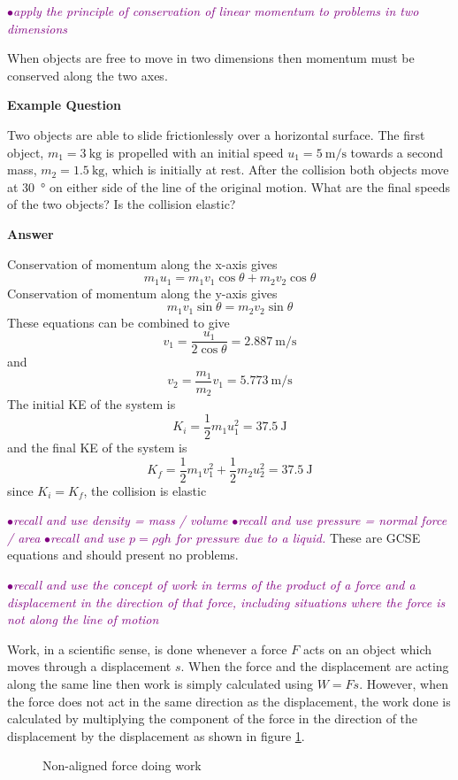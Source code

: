 \documentclass[a4paper,11pt,twoside]{memoir}
\newcounter{spec}[chapter]
\newcommand{\spec}[1]{\Needspace{5\baselineskip}\textcolor{purple}{$\bullet$\hspace{0.5cm}\textit{#1}}}
\newcommand{\answer}{\par \textbf{Answer} \par}
\newenvironment{example}
{\begin{lrbox}{\examplebox}\begin{minipage}{0.9\textwidth}\textbf{Example Question}\par}
{\end{minipage}\end{lrbox}\fbox{\usebox{\examplebox}}}
\begin{document}
\spec{apply the principle of conservation of linear momentum to problems in two dimensions}

When objects are free to move in two dimensions then momentum must be conserved along the two axes.

\begin{example}
	Two objects are able to slide frictionlessly over a horizontal surface. The first object, $m_1=\SI{3}{\kg}$ is propelled with an initial speed $u_1=\SI{5}{\m\per\s}$ towards a second mass, $m_2=\SI{1.5}{\kg}$, which is initially at rest. After the collision both objects move at \SI{30}{\degree} on either side of the line of the original motion. What are the final speeds of the two objects? Is the collision elastic?
	\answer
	Conservation of momentum along the x-axis gives
	$$ m_1u_1 = m_1v_1\cos{\theta} + m_2v_2\cos{\theta}$$
	Conservation of momentum along the y-axis gives
	$$ m_1v_1\sin{\theta} = m_2v_2\sin{\theta} $$
	These equations can be combined to give
	$$ v_1 = \frac{u_1}{2\cos{\theta}} = \SI{2.887}{\m\per\s}$$
	and
	$$ v_2 = \frac{m_1}{m_2}v_1= \SI{5.773}{\m\per\s}$$
	The initial KE of the system is
	$$ K_i = \frac{1}{2}m_1u_1^2 = \SI{37.5}{\joule} $$
	and the final KE of the system is
	$$ K_f = \frac{1}{2}m_1v_1^2 + \frac{1}{2}m_2u_2^2 = \SI{37.5}{\joule}$$
	since $K_i = K_f$, the collision is elastic
\end{example}

\spec{recall and use density = mass / volume}
\spec{recall and use pressure = normal force / area}
\spec{recall and use $ p = \rho gh $ for pressure due to a liquid.}
These are GCSE equations and should present no problems.

\spec{recall and use the concept of work in terms of the product of a force and a displacement in the direction of that force, including situations where the force is not along the line of motion}

Work, in a scientific sense, is done whenever a force $F$ acts on an object which moves through a displacement $s$. When the force and the displacement are acting along the same line then work is simply calculated using $W=Fs$. However, when the force does not act in the same direction as the displacement, the work done is calculated by multiplying the component of the force in the direction of the displacement by the displacement as shown in figure \ref{work}.

\begin{figure}[h]
  \begin{center}
  \end{center}
  \caption{Non-aligned force doing work}
  \label{work}
\end{figure}
\end{document}
